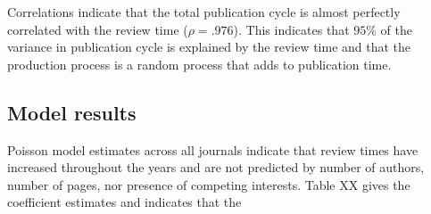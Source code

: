 Correlations indicate that the total publication cycle is almost perfectly correlated with the review time ($\rho=.976$). This indicates that $95\%$ of the variance in publication cycle is explained by the review time and that the production process is a random process that adds to publication time.

\subsection*{Model results}
Poisson model estimates across all journals indicate that review times have increased throughout the years and are not predicted by number of authors, number of pages, nor presence of competing interests. Table XX gives the coefficient estimates and indicates that the 